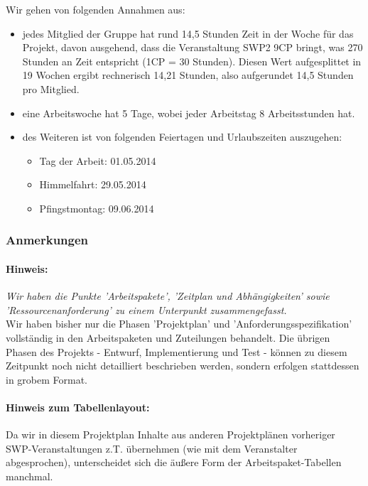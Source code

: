 \documentclass[fontsize=12pt,paper=a4,twoside]{scrartcl}
\begin{document}
Wir gehen von folgenden Annahmen aus: \\
\begin{itemize}
\item jedes Mitglied der Gruppe hat rund 14,5 Stunden Zeit in der Woche für das Projekt, davon ausgehend, dass die Veranstaltung SWP2 9CP bringt, was 270 Stunden an Zeit entspricht (1CP = 30 Stunden). Diesen Wert aufgesplittet in 19 Wochen ergibt rechnerisch 14,21 Stunden, also aufgerundet 14,5 Stunden pro Mitglied.

\item eine Arbeitswoche hat 5 Tage, wobei jeder Arbeitstag 8 Arbeitsstunden hat.

\item des Weiteren ist von folgenden Feiertagen und Urlaubszeiten auszugehen:
\begin{itemize}
\item Tag der Arbeit: 01.05.2014
\item Himmelfahrt: 29.05.2014
\item Pfingstmontag: 09.06.2014
\end{itemize}
\end{itemize}
\subsubsection{Anmerkungen}\label{aps}

\paragraph{Hinweis:} \textit{Wir haben die Punkte 'Arbeitspakete', 'Zeitplan und Abhängigkeiten' sowie 'Ressourcenanforderung' zu einem Unterpunkt zusammengefasst.}\\

Wir haben bisher nur die Phasen 'Projektplan' und 'Anforderungsspezifikation' vollständig in den Arbeitspaketen und Zuteilungen behandelt. Die übrigen Phasen des Projekts - Entwurf, Implementierung und Test - können zu diesem Zeitpunkt noch nicht detailliert beschrieben werden, sondern erfolgen stattdessen in grobem Format. \\

\paragraph{Hinweis zum Tabellenlayout:}Da wir in diesem Projektplan Inhalte aus anderen Projektplänen vorheriger SWP-Veranstaltungen z.T. übernehmen (wie mit dem Veranstalter abgesprochen), unterscheidet sich die äußere Form der Arbeitspaket-Tabellen manchmal. 
\end{document}
